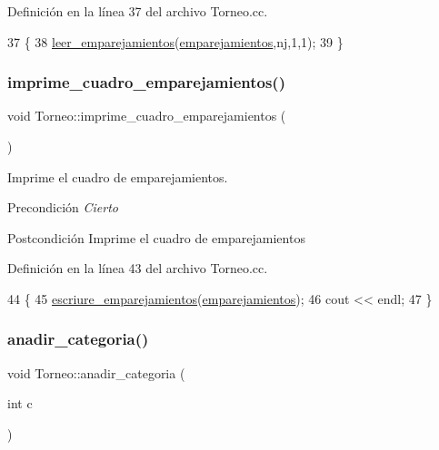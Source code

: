 Definición en la línea 37 del archivo Torneo.\+cc.


\begin{DoxyCode}
37                                                \{
38     \hyperlink{class_torneo_ae4d0e16d82621a4f5e16fcec74ccdcba}{leer\_emparejamientos}(\hyperlink{class_torneo_a18e1c1f6f9f658bc2c2390d3e2a9a853}{emparejamientos},nj,1,1);
39 \}
\end{DoxyCode}
\mbox{\label{class_torneo_adc22cda8d641ed9130e1171c4f8d5b84}} 
\subsubsection{\texorpdfstring{imprime\+\_\+cuadro\+\_\+emparejamientos()}{imprime\_cuadro\_emparejamientos()}}
{\footnotesize\ttfamily void Torneo\+::imprime\+\_\+cuadro\+\_\+emparejamientos (\begin{DoxyParamCaption}{ }\end{DoxyParamCaption})}



Imprime el cuadro de emparejamientos. 

\begin{DoxyPrecond}{Precondición}
{\itshape Cierto} 
\end{DoxyPrecond}
\begin{DoxyPostcond}{Postcondición}
Imprime el cuadro de emparejamientos 
\end{DoxyPostcond}


Definición en la línea 43 del archivo Torneo.\+cc.


\begin{DoxyCode}
44 \{
45   \hyperlink{class_torneo_ada7981ac531bf186fa6df689620574cc}{escriure\_emparejamientos}(\hyperlink{class_torneo_a18e1c1f6f9f658bc2c2390d3e2a9a853}{emparejamientos});
46   cout << endl;
47 \}
\end{DoxyCode}
\mbox{\label{class_torneo_a089468654daf52979cd7c393c51ceb85}} 
\subsubsection{\texorpdfstring{anadir\+\_\+categoria()}{anadir\_categoria()}}
{\footnotesize\ttfamily void Torneo\+::anadir\+\_\+categoria (\begin{DoxyParamCaption}\item[{int}]{c }\end{DoxyParamCaption})}



